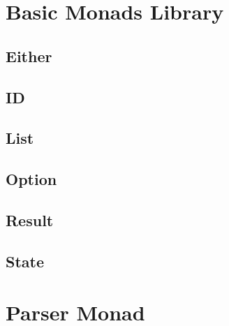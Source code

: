 \section{Basic Monads Library}
\subsection{Either}
\subsection{ID}
\subsection{List}
\subsection{Option}
\subsection{Result}
\subsection{State}

\section{Parser Monad}
